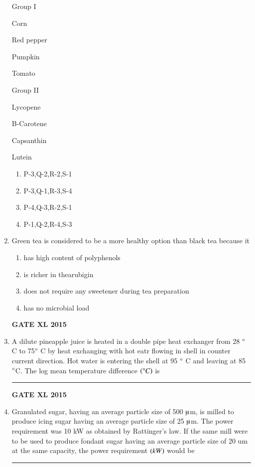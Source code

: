\documentclass[journal,12pt,onecolumn]{IEEEtran}
\begin{document}
\begin{enumerate}
	\begin{minipage}{0.5\textwidth}\begin{flushleft}
Group I

 Corn

 Red pepper

 Pumpkin

 Tomato 
	\end{flushleft}
	\end{minipage}
	\begin{minipage}{0.5\textwidth}\begin{flushleft}
Group II

 Lycopene

 B-Carotene

 Capsanthin

 Lutein
	\end{flushleft}
	\end{minipage}
    \begin{enumerate}
            \item P-3,Q-2,R-2,S-1
            \item P-3,Q-1,R-3,S-4
            \item P-4,Q-3,R-2,S-1
            \item P-1,Q-2,R-4,S-3
    \end{enumerate}
\item  Green tea is considered to be a more healthy option than black tea because it
    \begin{enumerate}
            \item  has high content of polyphenols
	    \item is richer in thearubigin
	    \item {does not require any sweetener during tea preparation}
	    \item {has no microbial load}
    \end{enumerate}
\hfill{\textbf{GATE XL 2015}}
\item  A dilute pineapple juice is heated in a double pipe heat exchanger from 28 $\degree$ C to 75$\degree$ C by heat exchanging with hot eatr flowing in shell in counter current direction. Hot water is entering the shell at 95 $\degree$ C and leaving at 85 $\degree$C. The log mean temperature difference $\left(\degree C\right)$ is \rule{1cm}{0.15mm}
\hfill{\textbf{GATE XL 2015}}
\item  Granulated sugar, having an average particle size of 500 $\micro$m, is milled to produce icing sugar having an average particle size of 25 $\micro$m. The power requirement was 10 kW as obtained by Rattinger's law. If the same mill were to be used to produce fondant sugar having an average particle size of 20 um at the same capacity, the power requirement $\left(kW\right)$ would be \rule{1cm}{0.15mm}
    

\end{enumerate}
\end{document}
